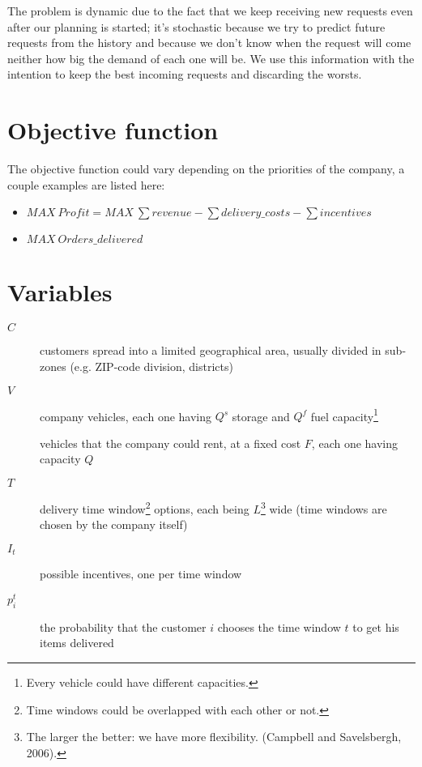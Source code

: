 \documentclass[10pt, letterpaper]{article}
\begin{document}
The problem is dynamic due to the fact that we keep receiving new requests even 
after our planning is started; it's stochastic because we try to predict future 
requests from the history and because we don't know when the request will come 
neither how big the demand of each one will be.
We use this information with the intention to keep the best incoming requests 
and discarding the worsts.

\section{Objective function}
The objective function could vary depending on the priorities of the company,
a couple examples are listed here:
\begin{itemize}
	\item \( MAX\ Profit = MAX\ \sum revenue -
								\sum delivery\_costs -
								\sum incentives \)

	\item \( MAX\ Orders\_delivered \)
\end{itemize}

\section{Variables}
\begin{description}
	\item[\(C\)] 
		customers spread into a limited geographical area, usually divided in
		sub-zones (e.g. ZIP-code division, districts)
	
	\item[\(V\)]
		company vehicles, each one having \(Q^{s}\) storage and \(Q^{f}\) 
		fuel capacity\footnote{Every vehicle could have different capacities.}

		vehicles that the company could rent, at a fixed cost \(F\), 
		each one having capacity \(Q\)

	\item[\(T\)]
		delivery time window\footnote{Time windows could be overlapped with 
		each other or not.} options, each being \(L\)\footnote{The larger 
		the better: we have more flexibility. (Campbell and Savelsbergh, 2006).}
		wide (time windows are chosen by the company itself)

	\item[\(I_{t}\)]
		possible incentives, one per time window

	\item[\(p_{i}^{t}\)]
		the probability that the customer \(i\) chooses the time window \(t\) 
		to get his items delivered
\end{description}
\end{document}
